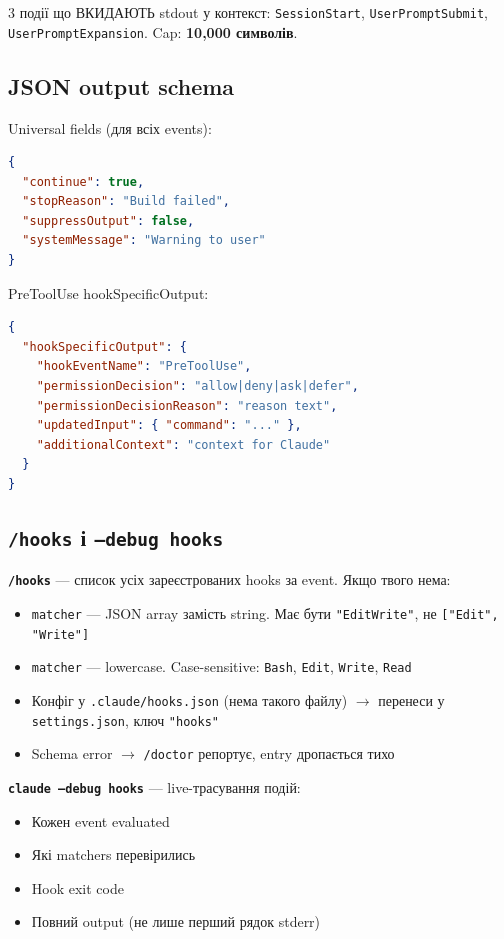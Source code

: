 \documentclass[11pt,a4paper]{article}
\begin{document}
3 події що ВКИДАЮТЬ stdout у контекст: \texttt{SessionStart}, \texttt{UserPromptSubmit}, \texttt{UserPromptExpansion}. Cap: \textbf{10,000 символів}.

\subsection{JSON output schema}

Universal fields (для всіх events):

\begin{lstlisting}[language=json]
{
  "continue": true,
  "stopReason": "Build failed",
  "suppressOutput": false,
  "systemMessage": "Warning to user"
}
\end{lstlisting}

PreToolUse hookSpecificOutput:

\begin{lstlisting}[language=json]
{
  "hookSpecificOutput": {
    "hookEventName": "PreToolUse",
    "permissionDecision": "allow|deny|ask|defer",
    "permissionDecisionReason": "reason text",
    "updatedInput": { "command": "..." },
    "additionalContext": "context for Claude"
  }
}
\end{lstlisting}

\subsection{\texttt{/hooks} і \texttt{--debug hooks}}

\textbf{\texttt{/hooks}} --- список усіх зареєстрованих hooks за event. Якщо твого нема:

\begin{itemize}
\item \texttt{matcher} --- JSON array замість string. Має бути \texttt{"Edit\textbar{}Write"}, не \texttt{["Edit", "Write"]}
\item \texttt{matcher} --- lowercase. Case-sensitive: \texttt{Bash}, \texttt{Edit}, \texttt{Write}, \texttt{Read}
\item Конфіг у \texttt{.claude/hooks.json} (нема такого файлу) $\to$ перенеси у \texttt{settings.json}, ключ \texttt{"hooks"}
\item Schema error $\to$ \texttt{/doctor} репортує, entry дропається тихо
\end{itemize}

\textbf{\texttt{claude --debug hooks}} --- live-трасування подій:

\begin{itemize}
\item Кожен event evaluated
\item Які matchers перевірились
\item Hook exit code
\item Повний output (не лише перший рядок stderr)
\end{itemize}
\end{document}
